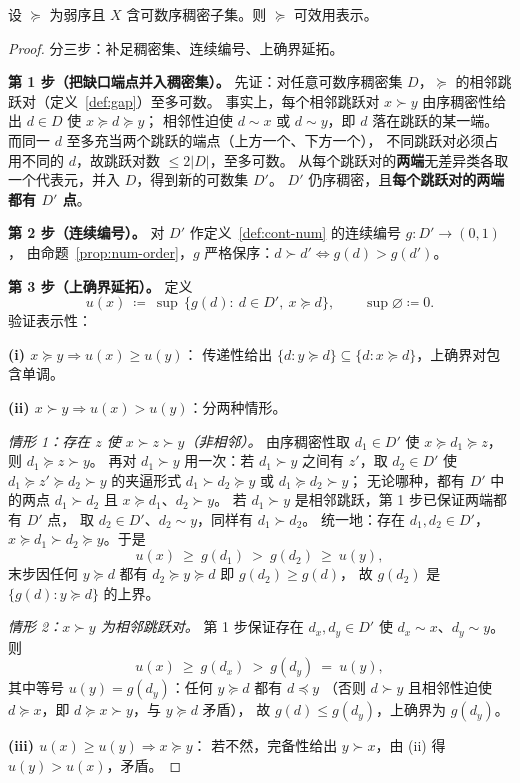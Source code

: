 \begin{theorem}[延拓表示定理]\label{thm:extension}
设 $\succeq$ 为弱序且 $X$ 含可数序稠密子集。则 $\succeq$ 可效用表示。
\end{theorem}

\begin{proof}
分三步：补足稠密集、连续编号、上确界延拓。

\textbf{第 1 步（把缺口端点并入稠密集）。}
先证：对任意可数序稠密集 $D$，$\succeq$ 的相邻跳跃对（定义~\ref{def:gap}）至多可数。
事实上，每个相邻跳跃对 $x\succ y$ 由序稠密性给出 $d\in D$ 使 $x\succeq d\succeq y$；
相邻性迫使 $d\sim x$ 或 $d\sim y$，即 $d$ 落在跳跃的某一端。
而同一 $d$ 至多充当两个跳跃的端点（上方一个、下方一个），
不同跳跃对必须占用不同的 $d$，故跳跃对数 $\le 2|D|$，至多可数。
从每个跳跃对的\textbf{两端}无差异类各取一个代表元，并入 $D$，得到新的可数集 $D'$。
$D'$ 仍序稠密，且\textbf{每个跳跃对的两端都有 $D'$ 点}。

\textbf{第 2 步（连续编号）。}
对 $D'$ 作定义~\ref{def:cont-num} 的连续编号 $g:D'\to(0,1)$，
由命题~\ref{prop:num-order}，$g$ 严格保序：$d\succ d'\iff g(d)>g(d')$。

\textbf{第 3 步（上确界延拓）。}
定义
\[
u(x)\ \coloneqq\ \sup\,\{g(d):\ d\in D',\ x\succeq d\},
\qquad \sup\varnothing\coloneqq 0.
\]
验证表示性：

\textbf{(i) $x\succeq y\Rightarrow u(x)\ge u(y)$}：
传递性给出 $\{d:y\succeq d\}\subseteq\{d:x\succeq d\}$，上确界对包含单调。

\textbf{(ii) $x\succ y\Rightarrow u(x)>u(y)$}：分两种情形。

\textit{情形 1：存在 $z$ 使 $x\succ z\succ y$（非相邻）。}
由序稠密性取 $d_1\in D'$ 使 $x\succeq d_1\succeq z$，则 $d_1\succeq z\succ y$。
再对 $d_1\succ y$ 用一次：若 $d_1\succ y$ 之间有 $z'$，取 $d_2\in D'$ 使
$d_1\succeq z'\succeq d_2\succ y$ 的夹逼形式 $d_1\succ d_2\succeq y$ 或 $d_1\succeq d_2\succ y$；
无论哪种，都有 $D'$ 中的两点 $d_1\succ d_2$ 且 $x\succeq d_1$、$d_2\succ y$。
若 $d_1\succ y$ 是相邻跳跃，第 1 步已保证两端都有 $D'$ 点，
取 $d_2\in D'$、$d_2\sim y$，同样有 $d_1\succ d_2$。
统一地：存在 $d_1,d_2\in D'$，$x\succeq d_1\succ d_2\succeq y$。于是
\[
u(x)\ \ge\ g(d_1)\ >\ g(d_2)\ \ge\ u(y),
\]
末步因任何 $y\succeq d$ 都有 $d_2\succeq y\succeq d$ 即 $g(d_2)\ge g(d)$，
故 $g(d_2)$ 是 $\{g(d):y\succeq d\}$ 的上界。

\textit{情形 2：$x\succ y$ 为相邻跳跃对。}
第 1 步保证存在 $d_x,d_y\in D'$ 使 $d_x\sim x$、$d_y\sim y$。则
\[
u(x)\ \ge\ g(d_x)\ >\ g(d_y)\ =\ u(y),
\]
其中等号 $u(y)=g(d_y)$：任何 $y\succeq d$ 都有 $d\preceq y$
（否则 $d\succ y$ 且相邻性迫使 $d\succeq x$，即 $d\succeq x\succ y$，与 $y\succeq d$ 矛盾），
故 $g(d)\le g(d_y)$，上确界为 $g(d_y)$。

\textbf{(iii) $u(x)\ge u(y)\Rightarrow x\succeq y$}：
若不然，完备性给出 $y\succ x$，由 (ii) 得 $u(y)>u(x)$，矛盾。
\end{proof}

